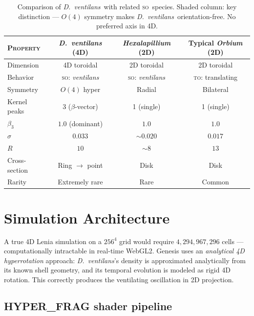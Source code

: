 \documentclass[11pt,a4paper]{article}
\newcommand{\spc}[1]{\textit{#1}}  %
\newcommand{\ventilans}{\textit{ventilans}}
\newcommand{\DV}{\spc{D.\ ventilans}}
\newcommand{\SO}{\textsc{so}}
\begin{document}
\begin{table}[h!]
\small\sffamily
\renewcommand{\arraystretch}{1.2}
\begin{tabularx}{\linewidth}{@{}l c c c@{}}
\toprule
\textsc{Property} & \textit{D.\ ventilans} (4D) & \textit{Hexalapillium} (2D) & Typical \textit{Orbium} (2D)\\
\midrule
Dimension      & \cellcolor{codebg}4D toroidal & 2D toroidal    & 2D toroidal\\
Behavior       & \cellcolor{codebg}\SO: \ventilans & \SO: \ventilans & \textsc{to}: translating\\
Symmetry       & \cellcolor{codebg}$O(4)$ hyper & Radial         & Bilateral\\
Kernel peaks   & \cellcolor{codebg}3 ($\beta$-vector) & 1 (single) & 1 (single)\\
$\beta_{3}$    & \cellcolor{codebg}$1.0$ (dominant) & $1.0$       & $1.0$\\
$\sigma$       & \cellcolor{codebg}$0.033$ & $\sim\!0.020$       & $0.017$\\
$R$            & \cellcolor{codebg}$10$   & $\sim\!8$           & $13$\\
Cross-section  & \cellcolor{codebg}Ring $\to$ point & Disk       & Disk\\
Rarity         & \cellcolor{codebg}Extremely rare & Rare         & Common\\
\bottomrule
\end{tabularx}
\caption{\small Comparison of \DV\ with related \SO\ species. Shaded column:
key distinction --- $O(4)$ symmetry makes \DV\ orientation-free. No
preferred axis in 4D.}
\end{table}

\section{Simulation Architecture}

A true 4D Lenia simulation on a $256^{4}$ grid would require
$4{,}294{,}967{,}296$ cells --- computationally intractable in real-time
WebGL2. Genesis uses an \emph{analytical 4D hyperrotation} approach:
\DV's density is approximated analytically from its known shell geometry,
and its temporal evolution is modeled as rigid 4D rotation. This
correctly produces the ventilating oscillation in 2D projection.

\subsection{HYPER\_FRAG shader pipeline}
\end{document}
